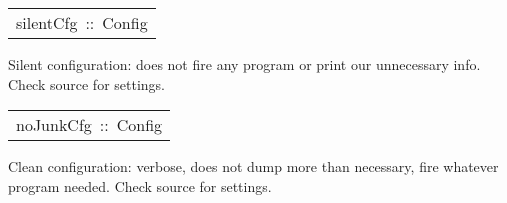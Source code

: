 \begin{haddockdesc}
\item[\begin{tabular}{@{}l}
silentCfg\ ::\ Config
\end{tabular}]\haddockbegindoc
Silent configuration: does not fire any program or print our
 unnecessary info. Check source for settings.\par

\end{haddockdesc}
\begin{haddockdesc}
\item[\begin{tabular}{@{}l}
noJunkCfg\ ::\ Config
\end{tabular}]\haddockbegindoc
Clean configuration: verbose, does not dump more than necessary,
 fire whatever program needed. Check source for settings.\par

\end{haddockdesc}
